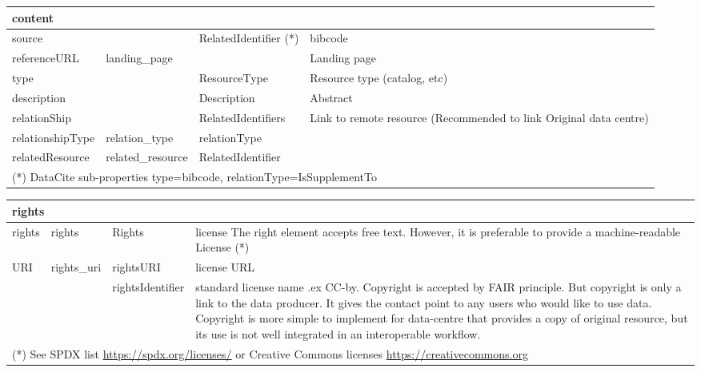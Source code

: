 \documentclass[11pt,a4paper]{ivoa}
\begin{document}
\begin{tabular}{|p{3cm}|p{3cm}|p{3cm}|p{5cm}|} \hline
\multicolumn{4}{|l|}{\textbf{content} } \\ \hline
source        & & RelatedIdentifier (*) & bibcode\\ \hline
referenceURL  & landing\_page &  & Landing page \\ \hline
type          &  & ResourceType & Resource type (catalog, etc)\\ \hline
description   &  & Description  & Abstract\\ \hline
relationShip  &   & RelatedIdentifiers &Link to remote resource (Recommended to link Original data centre) \\ \hline
relationshipType &  relation\_type & relationType &\\ \hline
relatedResource  &  related\_resource & RelatedIdentifier & \\ \hline
\multicolumn{4}{l}{\small \footnotesize(*) DataCite sub-properties type=bibcode, relationType=IsSupplementTo} \\
\end{tabular}

\begin{tabular}{|p{3cm}|p{3cm}|p{3cm}|p{5cm}|} \hline
\multicolumn{4}{|l|}{\textbf{rights}} \\ \hline
rights   & rights & Rights& license
          The right element accepts free text. However, it is preferable to provide a machine-readable License (*)
         \\ \hline
URI     &  rights\_uri& rightsURI & license URL\\ \hline
        & & rightsIdentifier & standard license name .ex CC-by.
         Copyright is accepted by FAIR principle. But copyright is only a link to the data producer. It gives the contact point to any users who would like to use data. Copyright is more simple to implement for data-centre that provides a copy of original resource, but its use is not well integrated in an interoperable workflow.
         \\ \hline
\multicolumn{4}{p{\textwidth}}{\small \footnotesize(*) See SPDX list \url{https://spdx.org/licenses/} or Creative Commons licenses \url{https://creativecommons.org}}
\end{tabular}\\
\end{document}
